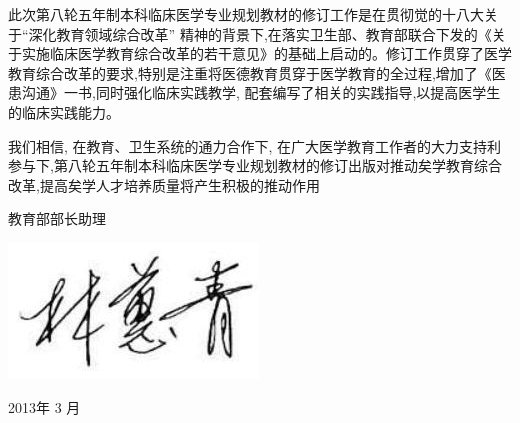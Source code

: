 \documentclass[10pt]{article}
\begin{document}
此次第八轮五年制本科临床医学专业规划教材的修订工作是在贯彻觉的十八大关于“深化教育领域综合改革” 精神的背景下,在落实卫生部、教育部联合下发的《关于实施临床医学教育综合改革的若干意见》的基础上启动的。修订工作贯穿了医学教育综合改革的要求,特别是注重将医德教育贯穿于医学教育的全过程,增加了《医患沟通》一书,同时强化临床实践教学, 配套编写了相关的实践指导,以提高医学生的临床实践能力。

我们相信, 在教育、卫生系统的通力合作下, 在广大医学教育工作者的大力支持利参与下,第八轮五年制本科临床医学专业规划教材的修订出版对推动矣学教育综合改革,提高矣学人才培养质量将产生积极的推动作用

教育部部长助理

\begin{center}
\includegraphics[max width=\textwidth]{2024_07_09_002a177993bd97d1d6d7g-009(1)}
\end{center}

2013年 3 月
\end{document}
